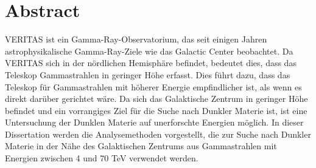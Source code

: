 \cleartooddpage[\thispagestyle{empty}]
\section*{Abstract}

VERITAS ist ein Gamma-Ray-Observatorium, das seit einigen Jahren astrophysikalische Gamma-Ray-Ziele wie das Galactic Center beobachtet.
Da VERITAS sich in der nördlichen Hemisphäre befindet, bedeutet dies, dass das Teleskop Gammastrahlen in geringer Höhe erfasst.
Dies führt dazu, dass das Teleskop für Gammastrahlen mit höherer Energie empfindlicher ist, als wenn es direkt darüber gerichtet wäre.
Da sich das Galaktische Zentrum in geringer Höhe befindet und ein vorrangiges Ziel für die Suche nach Dunkler Materie ist, ist eine Untersuchung der Dunklen Materie auf unerforschte Energien möglich.
In dieser Dissertation werden die Analysemethoden vorgestellt, die zur Suche nach Dunkler Materie in der Nähe des Galaktischen Zentrums aus Gammastrahlen mit Energien zwischen 4 und 70 TeV verwendet werden.



\cleartoevenpage[\thispagestyle{plain}]
\null
